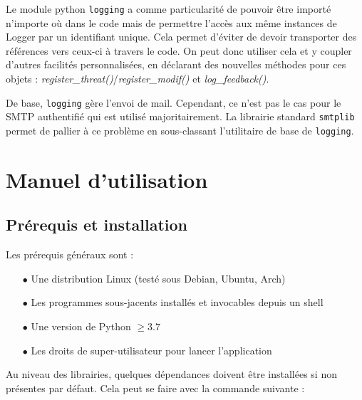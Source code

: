 \documentclass[]{article}
\begin{document}
Le module python \texttt{logging} a comme particularité de pouvoir être importé n'importe où dans le code mais de permettre l'accès aux même instances de Logger par un identifiant unique. Cela permet d'éviter de devoir transporter des références vers ceux-ci à travers le code. On peut donc utiliser cela et y coupler d'autres facilités personnalisées, en déclarant des nouvelles méthodes pour ces objets : \textit{register\_threat()}/\textit{register\_modif()} et \textit{log\_feedback()}.\\

\par De base, \texttt{logging} gère l'envoi de mail. Cependant, ce n'est pas le cas pour le SMTP authentifié qui est utilisé majoritairement. La librairie standard \texttt{smtplib} permet de pallier à ce problème en sous-classant l'utilitaire de base de \texttt{logging}.



\newpage

\section{Manuel d'utilisation}
\label{manuel}

\subsection{Prérequis et installation}
\label{install}
Les prérequis généraux sont :
\begin{itemize}
\vspace{0.1cm}
\item[$\bullet$] Une distribution Linux (testé sous Debian, Ubuntu, Arch)
\vspace{0.1cm}
\item[$\bullet$] Les programmes sous-jacents installés et invocables depuis un shell
\vspace{0.1cm}
\item[$\bullet$] Une version de Python $\geq 3.7$
\vspace{0.1cm}
\item[$\bullet$] Les droits de super-utilisateur pour lancer l'application
\end{itemize}
\vspace{0.1cm}

Au niveau des librairies, quelques dépendances doivent être installées si non présentes par défaut. Cela peut se faire avec la commande suivante :\\
\end{document}

